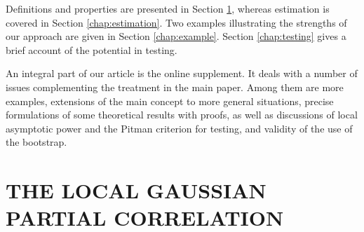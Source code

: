\documentclass[
  12pt,
  letterpaper]{article}
\theoremstyle{definition}
\theoremstyle{definition}
\theoremstyle{definition}
\theoremstyle{remark}
\begin{document}
Definitions and properties are presented in Section \ref{chap:conditional}, whereas estimation is covered in Section \ref{chap:estimation}. Two examples illustrating the strengths of our approach are given in Section \ref{chap:example}. Section \ref{chap:testing} gives a brief account of the potential in testing.

An integral part of our article is the online supplement. It deals with a number of issues complementing the treatment in the main paper. Among them are more examples, extensions of the main concept to more general situations, precise formulations of some theoretical results with proofs, as well as discussions of local asymptotic power and the Pitman criterion for testing, and validity of the use of the bootstrap.

\hypertarget{chap:conditional}{%
\section{THE LOCAL GAUSSIAN PARTIAL CORRELATION}\label{chap:conditional}}
\end{document}
